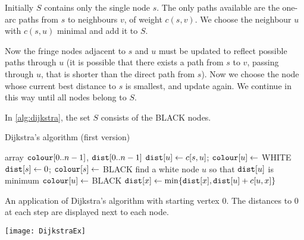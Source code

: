 Initially $S$ contains only the
single node $s$. The only paths available are the one-arc paths from $s$ to neighbours 
$v$, of weight $c(s, v)$. We choose the neighbour $u$ with $c(s, u)$ minimal and
add it to $S$. 

Now the fringe nodes adjacent to $s$ and $u$ must be
updated to reflect possible paths  through $u$ (it is possible that there
exists a path from $s$ to $v$, passing through $u$, that is shorter
than the direct path from $s$). 
Now we choose the node %
whose current best distance to $s$ is smallest, and update
again. We continue in this way until all nodes belong to $S$.

In \cref{alg:dijkstra}, the set $S$ consists of the BLACK nodes.


\begin{algorithm}[H]
  \caption{Dijkstra's algorithm (first version)}
    \label{alg:dijkstra}
\begin{algorithmic}[1]
	\State array $\colour[0..n-1]$, $\dist[0..n-1]$
		\State $\dist[u] \gets c[s,u]$; $\colour[u] \gets$ WHITE 
	\EndFor
	\State $\dist[s] \gets 0$; $\colour[s] \gets $ BLACK
		\State find a white node $u$ so that $\dist[u]$ is minimum
		\State $\colour[u] \gets $ BLACK
				\State $\dist[x] \gets \min \{\dist[x], \dist[u] + c[u,x]\}$  
			\EndIf
		\EndFor
	\EndWhile
	\State \Return{$\dist$}
\EndFunction
\end{algorithmic}
\end{algorithm}

\begin{Boxample}
An application of Dijkstra's algorithm with starting vertex $0$. 
The distances to 0 at each step are displayed next to each node.
\begin{center}
\texttt{[image: DijkstraEx]}
\end{center}
\end{Boxample}

